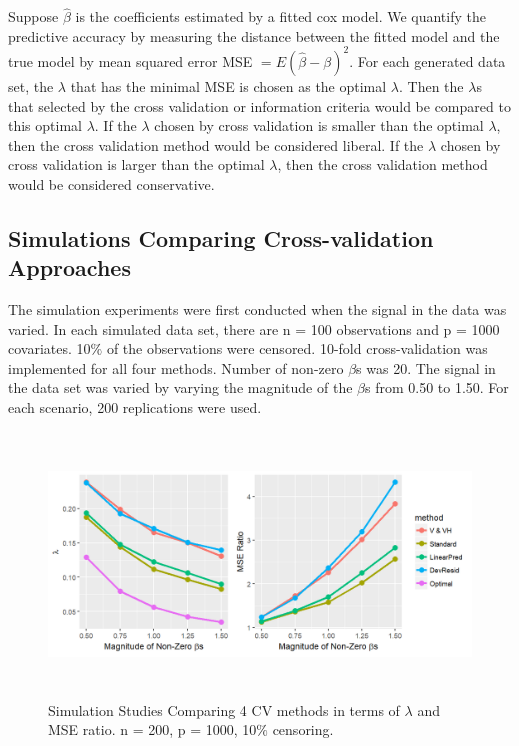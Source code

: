   Suppose $\hat{\beta}$ is the coefficients estimated by a fitted cox model. We quantify the predictive accuracy by measuring the distance between the fitted model and the true model by mean squared error MSE $= E(\hat{\beta} - \beta)^2$. For each generated data set, the $\lambda$ that has the minimal MSE is chosen as the optimal $\lambda$. Then the $\lambda$s that selected by the cross validation or information criteria would be compared to this optimal $\lambda$. If the $\lambda$ chosen by cross validation is smaller than the optimal $\lambda$, then the cross validation method would be considered liberal. If the $\lambda$ chosen by cross validation is larger than the optimal $\lambda$, then the cross validation method would be considered conservative. 
     
    \subsection {Simulations Comparing Cross-validation Approaches}
   The simulation experiments were first conducted when the signal in the data was varied. In each simulated data set, there are n = 100 observations and p = 1000 covariates. 10$\%$ of the observations were censored. 10-fold cross-validation was implemented for all four methods. Number of non-zero $\beta$s was 20. The signal in the data set was varied by varying the magnitude of the $\beta$s from 0.50 to 1.50. For each scenario, 200 replications were used.
   
\begin{figure}[h]
    \centering
		\includegraphics[height= 7cm ]{./figures/figure_2.png}
    \caption{Simulation Studies Comparing 4 CV methods in terms of $\lambda$ and MSE ratio. n = 200, p = 1000, 10$\%$ censoring.}
\end{figure}	

